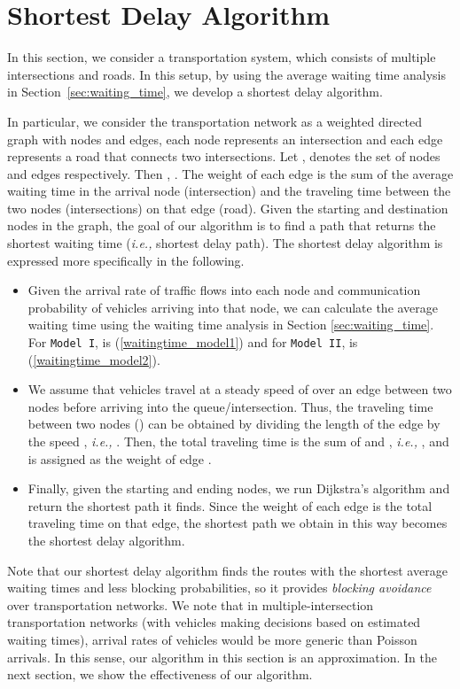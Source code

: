 \documentclass[conference]{IEEEtran}
\newcommand{\ie}{{\em i.e., }}
\newcommand{\modelI}{{\tt{Model I}}}
\newcommand{\modelII}{{\tt{Model II}}}
\begin{document}
\vspace{-5pt}
\section{Shortest Delay Algorithm}\label{sec:algorithm}
In this section, we consider a transportation system, which consists of multiple intersections and roads. In this setup, by using the average waiting time analysis in Section~\ref{sec:waiting_time}, we develop a shortest delay algorithm.

In particular, we consider the transportation network as a weighted directed graph  with  nodes and  edges, each node represents an intersection and each edge represents a road that connects two intersections. Let ,  denotes the set of nodes and edges respectively. Then , . The weight of each edge is the sum of the average waiting time in the arrival node (intersection) and the traveling time between the two nodes (intersections) on that edge (road). Given the starting and destination nodes in the graph, the goal of our algorithm is to find a path that returns the shortest waiting time (\ie shortest delay path). The shortest delay algorithm is expressed more specifically in the following.
\begin{itemize}
\item Given the arrival rate of traffic flows into each node  and communication probability of vehicles arriving into that node, we can calculate the average waiting time  using the waiting time analysis in Section \ref{sec:waiting_time}. For \modelI,  is (\ref{waitingtime_model1}) and for \modelII,  is (\ref{waitingtime_model2}).

\item We assume that vehicles travel at a steady speed of  over an edge between two nodes before arriving into the queue/intersection. Thus, the traveling time between two nodes  () can be obtained by dividing the length of the edge  by the speed , \ie . Then, the total traveling time  is the sum of  and , \ie , and  is assigned as the weight of edge .

\item Finally, given the starting and ending nodes, we run Dijkstra's algorithm and return the shortest path it finds. Since the weight of each edge is the total traveling time on that edge, the shortest path we obtain in this way becomes the shortest delay algorithm.
\end{itemize}

Note that our shortest delay algorithm finds the routes with the shortest average waiting times and less blocking probabilities, so it provides {\em blocking avoidance} over transportation networks. We note that in multiple-intersection transportation networks (with vehicles making decisions based on estimated waiting times), arrival rates of vehicles would be more generic than Poisson arrivals. In this sense, our algorithm in this section is an approximation. In the next section, we show the effectiveness of our algorithm.
\end{document}
